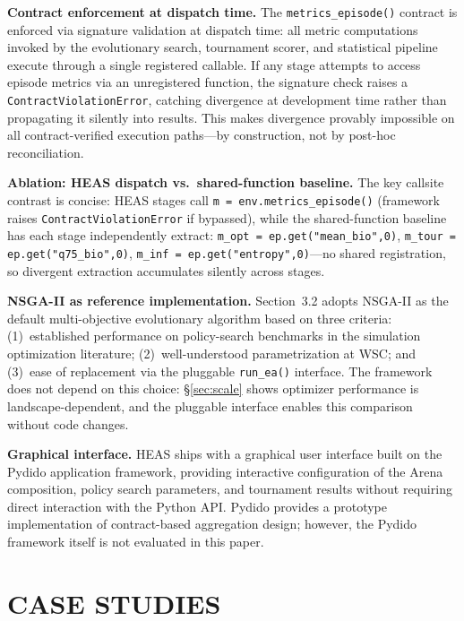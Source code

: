 \documentclass{wscpaperproc}
\begin{document}
\textbf{Contract enforcement at dispatch time.} The \texttt{metrics\_episode()}
contract is enforced via signature validation at dispatch time: all metric
computations invoked by the evolutionary search, tournament scorer, and
statistical pipeline execute through a single registered callable. If any stage
attempts to access episode metrics via an unregistered function, the signature
check raises a \texttt{ContractViolationError}, catching divergence at development
time rather than propagating it silently into results. This makes divergence
provably impossible on all contract-verified execution paths---by construction,
not by post-hoc reconciliation.

\textbf{Ablation: HEAS dispatch vs.\ shared-function baseline.}
The key callsite contrast is concise: HEAS stages call
\texttt{m = env.metrics\_episode()} (framework raises
\texttt{ContractViolationError} if bypassed), while the
shared-function baseline has each stage independently extract:
\texttt{m\_opt = ep.get("mean\_bio",0)},
\texttt{m\_tour = ep.get("q75\_bio",0)},
\texttt{m\_inf = ep.get("entropy",0)}---no shared registration,
so divergent extraction accumulates silently across stages.

\textbf{NSGA-II as reference implementation.} Section~3.2 adopts NSGA-II as the
default multi-objective evolutionary algorithm based on three criteria:
(1)~established performance on policy-search benchmarks in the simulation
optimization literature; (2)~well-understood parametrization at WSC; and
(3)~ease of replacement via the pluggable \texttt{run\_ea()} interface. The
framework does not depend on this choice: \S\ref{sec:scale} shows optimizer performance is landscape-dependent, and the pluggable interface enables this comparison without code changes.

\textbf{Graphical interface.} HEAS ships with a graphical user interface
built on the Pydido application framework, providing interactive configuration
of the Arena composition, policy search parameters, and tournament results
without requiring direct interaction with the Python API.
Pydido provides a prototype implementation of contract-based aggregation design;
however, the Pydido framework itself is not evaluated in this paper.

\section{CASE STUDIES}
\end{document}
